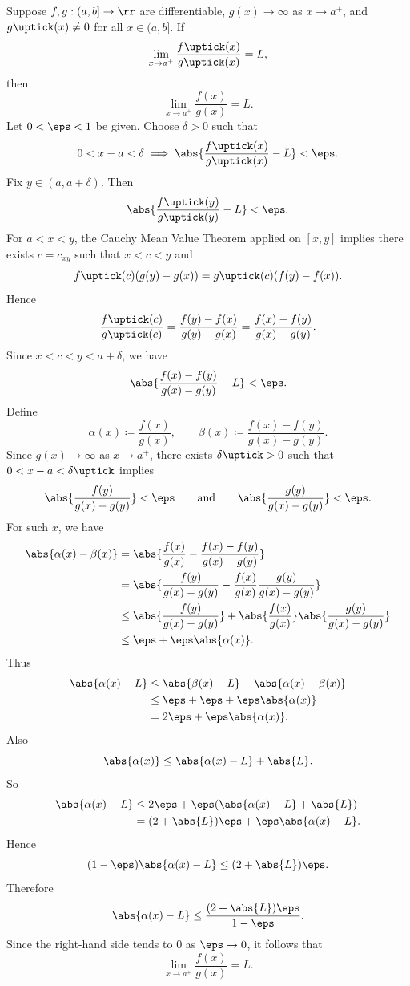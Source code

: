 

\begin{theorem}{
    Suppose $f,g : (a,b] \to\rr$ are differentiable, $g(x)\to \infty$ as $x\to a^+$, and $g\uptick(x)\neq 0$ for all $x\in(a,b]$.
    If
    \[
        \lim_{x\to a^+}\dfrac{f\uptick(x)}{g\uptick(x)} = L,
    \]
    then
    \[
        \lim_{x\to a^+}\dfrac{f(x)}{g(x)} = L.
    \]
}
	Let $0 < \eps < 1$ be given.
    Choose $\delta > 0$ such that
    \[
        0 < x-a < \delta \implies \abs{\dfrac{f\uptick(x)}{g\uptick(x)} - L} < \eps.
    \]
    Fix $y\in(a,a+\delta)$.
    Then
    \[
        \abs{\dfrac{f\uptick(y)}{g\uptick(y)} - L} < \eps.
    \]
    For $a < x < y$, the Cauchy Mean Value Theorem applied on $[x,y]$ implies there exists $c = c_{xy}$ such that $x < c < y$ and
    \[
        f\uptick(c)(g(y) - g(x)) = g\uptick(c)(f(y) - f(x)).
    \]
    Hence
    \[
        \dfrac{f\uptick(c)}{g\uptick(c)} = \dfrac{f(y) - f(x)}{g(y) - g(x)} = \dfrac{f(x) - f(y)}{g(x) - g(y)}.
    \]
    Since $x<c<y<a+\delta$, we have
    \[
        \abs{\dfrac{f(x) - f(y)}{g(x) - g(y)} - L} < \eps.
    \]
    Define
    \[
        \alpha(x) \coloneqq \dfrac{f(x)}{g(x)},
        \qquad
        \beta(x) \coloneqq \dfrac{f(x)-f(y)}{g(x)-g(y)}.
    \]
    Since $g(x)\to\infty$ as $x\to a^+$, there exists $\delta\uptick > 0$ such that $0 < x-a < \delta\uptick$ implies
    \[
        \abs{\dfrac{f(y)}{g(x)-g(y)}} < \eps
        \qquad\text{and}\qquad
        \abs{\dfrac{g(y)}{g(x)-g(y)}} < \eps.
    \]
    For such $x$, we have
    \begin{align*}
        \abs{\alpha(x) - \beta(x)}
        &= \abs{\dfrac{f(x)}{g(x)} - \dfrac{f(x)-f(y)}{g(x)-g(y)}}\\
        &= \abs{\dfrac{f(y)}{g(x)-g(y)} - \dfrac{f(x)}{g(x)}\dfrac{g(y)}{g(x)-g(y)}}\\
        &\leq \abs{\dfrac{f(y)}{g(x)-g(y)}} + \abs{\dfrac{f(x)}{g(x)}}\abs{\dfrac{g(y)}{g(x)-g(y)}}\\
        &\leq \eps + \eps\abs{\alpha(x)}.
    \end{align*}
    Thus
    \begin{align*}
        \abs{\alpha(x)-L}
        &\leq \abs{\beta(x)-L} + \abs{\alpha(x)-\beta(x)}\\
        &\leq \eps + \eps + \eps\abs{\alpha(x)}\\
        &= 2\eps + \eps\abs{\alpha(x)}.
    \end{align*}
    Also
    \[
        \abs{\alpha(x)} \leq \abs{\alpha(x)-L} + \abs{L}.
    \]
    So
    \begin{align*}
        \abs{\alpha(x)-L}
        &\leq 2\eps + \eps(\abs{\alpha(x)-L} + \abs{L})\\
        &= (2+\abs{L})\eps + \eps\abs{\alpha(x)-L}.
    \end{align*}
    Hence
    \[
        (1-\eps)\abs{\alpha(x)-L} \leq (2+\abs{L})\eps.
    \]
    Therefore
    \[
        \abs{\alpha(x)-L} \leq \dfrac{(2+\abs{L})\eps}{1-\eps}.
    \]
    Since the right-hand side tends to $0$ as $\eps\to 0$, it follows that
    \[
        \lim_{x\to a^+}\dfrac{f(x)}{g(x)} = L.
    \]
\end{theorem}